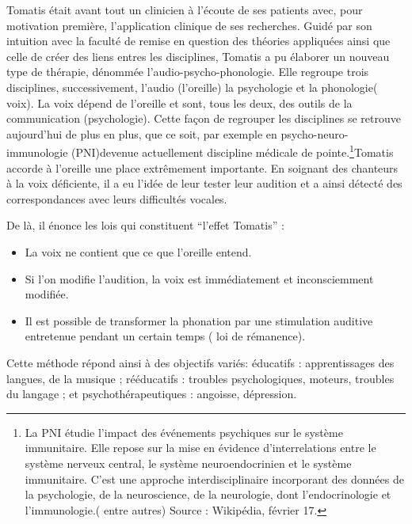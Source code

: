 Tomatis était avant tout un clinicien à l'écoute de ses patients avec,
pour motivation première, l'application clinique de ses recherches.
Guidé par son intuition avec la faculté de remise en question des
théories appliquées ainsi que celle de créer des liens entres les
disciplines, Tomatis a pu élaborer un nouveau type de thérapie, dénommée
l'audio-psycho-phonologie. Elle regroupe trois disciplines, successivement,
l'audio (l'oreille) la psychologie et la phonologie( voix). La voix
dépend de l'oreille et sont, tous les deux, des outils de la communication
(psychologie). Cette façon de regrouper les disciplines se retrouve
aujourd'hui de plus en plus, que ce soit, par exemple en psycho-neuro-immunologie
(PNI)devenue actuellement discipline médicale de pointe.\footnote{La PNI étudie l'impact des événements psychiques sur le système immunitaire.
Elle repose sur la mise en évidence d'interrelations entre le système
nerveux central, le système neuroendocrinien et le système immunitaire.
C'est une approche interdisciplinaire incorporant des données de la
psychologie, de la neuroscience, de la neurologie, dont l'endocrinologie
et l'immunologie.( entre autres) Source : Wikipédia, février 17.}Tomatis accorde à l'oreille une place extrêmement importante. En soignant
des chanteurs à la voix déficiente, il a eu l'idée de leur tester
leur audition et a ainsi détecté des correspondances avec leurs difficultés
vocales.

De là, il énonce les lois qui constituent ``l'effet Tomatis'' : 
\begin{itemize}
\item La voix ne contient que ce que l'oreille entend.
\item Si l'on modifie l'audition, la voix est immédiatement et inconsciemment
modifiée.
\item Il est possible de transformer la phonation par une stimulation auditive
entretenue pendant un certain temps ( loi de rémanence).
\end{itemize}
Cette méthode répond ainsi à des objectifs variés: éducatifs : apprentissages
des langues, de la musique ; rééducatifs : troubles psychologiques,
moteurs, troubles du langage ; et psychothérapeutiques : angoisse,
dépression. 

